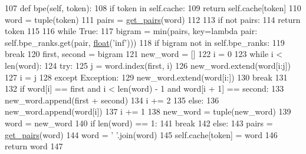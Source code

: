 \begin{DoxyCode}
107     \textcolor{keyword}{def }bpe(self, token):
108         \textcolor{keywordflow}{if} token \textcolor{keywordflow}{in} self.cache:
109             \textcolor{keywordflow}{return} self.cache[token]
110         word = tuple(token)
111         pairs = \hyperlink{namespaceparlai_1_1core_1_1gpt2__helper_ac5bffa2aece99e43444185ba85dff425}{get\_pairs}(word)
112 
113         \textcolor{keywordflow}{if} \textcolor{keywordflow}{not} pairs:
114             \textcolor{keywordflow}{return} token
115 
116         \textcolor{keywordflow}{while} \textcolor{keyword}{True}:
117             bigram = min(pairs, key=\textcolor{keyword}{lambda} pair: self.bpe\_ranks.get(pair, \hyperlink{namespaceprojects_1_1controllable__dialogue_1_1make__control__dataset_aa2b7207688c641dbc094ab44eca27113}{float}(\textcolor{stringliteral}{'inf'})))
118             \textcolor{keywordflow}{if} bigram \textcolor{keywordflow}{not} \textcolor{keywordflow}{in} self.bpe\_ranks:
119                 \textcolor{keywordflow}{break}
120             first, second = bigram
121             new\_word = []
122             i = 0
123             \textcolor{keywordflow}{while} i < len(word):
124                 \textcolor{keywordflow}{try}:
125                     j = word.index(first, i)
126                     new\_word.extend(word[i:j])
127                     i = j
128                 \textcolor{keywordflow}{except} Exception:
129                     new\_word.extend(word[i:])
130                     \textcolor{keywordflow}{break}
131 
132                 \textcolor{keywordflow}{if} word[i] == first \textcolor{keywordflow}{and} i < len(word) - 1 \textcolor{keywordflow}{and} word[i + 1] == second:
133                     new\_word.append(first + second)
134                     i += 2
135                 \textcolor{keywordflow}{else}:
136                     new\_word.append(word[i])
137                     i += 1
138             new\_word = tuple(new\_word)
139             word = new\_word
140             \textcolor{keywordflow}{if} len(word) == 1:
141                 \textcolor{keywordflow}{break}
142             \textcolor{keywordflow}{else}:
143                 pairs = \hyperlink{namespaceparlai_1_1core_1_1gpt2__helper_ac5bffa2aece99e43444185ba85dff425}{get\_pairs}(word)
144         word = \textcolor{stringliteral}{' '}.join(word)
145         self.cache[token] = word
146         \textcolor{keywordflow}{return} word
147 
\end{DoxyCode}
\mbox{\label{classparlai_1_1core_1_1gpt2__helper_1_1Gpt2BpeHelper_a54e448f943687a8afe9bcc97741d06b9}} 
